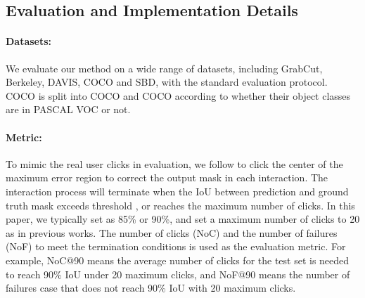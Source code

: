 \documentclass{bmvc2k}
\begin{document}
\vspace{-2mm}
\subsection{Evaluation and Implementation Details}

\paragraph{Datasets:} We evaluate our method on a wide range of datasets, including GrabCut, Berkeley, DAVIS, COCO and SBD, with the standard evaluation protocol. COCO is split into COCO and COCO according to whether their object classes are in PASCAL VOC or not.














\vspace{-2mm}
\paragraph{\textbf{Metric:}} To mimic the real user clicks in evaluation, we follow \cite{xu2016deep} to click the center of the maximum error region to correct the output mask in each interaction. The interaction process will terminate when the IoU between prediction and ground truth mask exceeds threshold , or reaches the maximum number of clicks. 
In this paper, we typically set  as 85\% or 90\%, and set a maximum number of clicks to 20 as in previous works.
The number of clicks (NoC) and the number of failures (NoF) to meet the termination conditions is used as the evaluation metric. For example, NoC@90 means the average number of clicks for the test set is needed to reach 90\% IoU under 20 maximum clicks, and NoF@90 means the number of failures case that does not reach 90\% IoU with 20 maximum clicks.

\vspace{-2mm}
\end{document}

